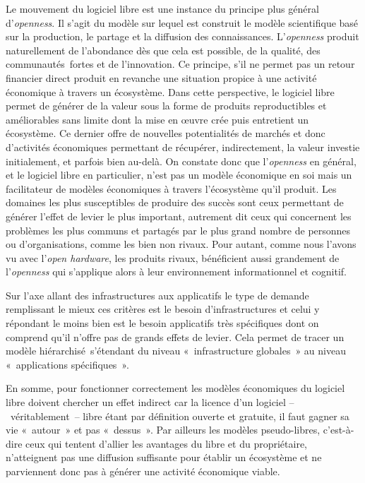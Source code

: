 \documentclass{FramateX}
\begin{document}
\begin{refsection}
Le mouvement du logiciel libre est une instance du principe plus général
d'\textit{openness}. Il s'agit du modèle sur lequel est construit le
modèle scientifique basé sur la production, le partage et la diffusion
des connaissances. L'\textit{openness} produit naturellement de
l'abondance dès que cela est possible, de la qualité, des
communautés~fortes et de l'innovation. Ce principe,
s'il ne permet pas un retour financier direct produit
en revanche une situation propice à une activité économique à travers
un écosystème. Dans cette perspective, le logiciel libre permet de
générer de la valeur sous la forme de produits reproductibles et
améliorables sans limite dont la mise en œuvre crée puis entretient un
écosystème. Ce dernier offre de nouvelles potentialités de marchés et
donc d'activités économiques permettant de récupérer, indirectement, la
valeur investie initialement, et parfois bien au-delà. On constate donc
que l'\textit{openness} en général, et le logiciel
libre en particulier, n'est pas un modèle économique en soi mais un
facilitateur de modèles économiques à travers
l'écosystème qu'il produit. Les
domaines les plus susceptibles de produire des succès sont ceux
permettant de générer l'effet de levier le plus important, autrement
dit ceux qui concernent les problèmes les plus communs et partagés par
le plus grand nombre de personnes ou d'organisations,
comme les bien non rivaux. Pour autant, comme nous
l'avons vu avec l'\textit{open
hardware}, les produits rivaux, bénéficient aussi grandement de
l'\textit{openness} qui s'applique
alors à leur environnement informationnel et cognitif.

Sur l'axe allant des infrastructures aux applicatifs le
type de demande remplissant le mieux ces critères est le besoin
d'infrastructures et celui y répondant le moins bien est le besoin
applicatifs très spécifiques dont on comprend qu'il
n'offre pas de grands effets de levier. Cela permet de
tracer un modèle hiérarchisé~s'étendant du niveau «~infrastructure
globales~» au niveau «~applications spécifiques~».

En somme, pour fonctionner correctement les modèles économiques du
logiciel libre doivent chercher un effet indirect car la licence d'un
logiciel --~véritablement~-- libre étant par définition ouverte et
gratuite, il faut gagner sa vie «~autour~» et pas «~dessus~». Par
ailleurs les modèles pseudo-libres, c'est-à-dire ceux qui tentent
d'allier les avantages du libre et du propriétaire,
n'atteignent pas une diffusion suffisante pour établir
un écosystème et ne parviennent donc pas à générer une activité
économique viable.


\end{refsection}
\end{document}
